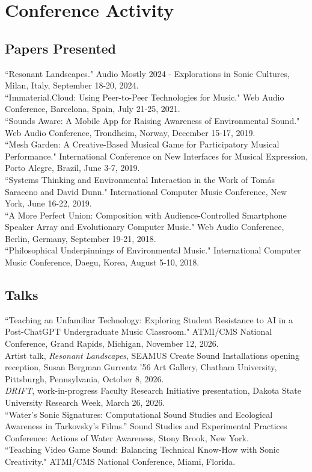 \documentclass[12pt, a4paper]{article}
\newcommand{\years}[1]{\leavevmode\marginnote{\scriptsize #1}\ignorespaces}%
\begin{document}
\section*{Conference Activity}

\subsection*{Papers Presented}
\years{2024} ``Resonant Landscapes." Audio Mostly 2024 - Explorations in Sonic Cultures, Milan, Italy, September 18-20, 2024.\\
\years{2021} ``Immaterial.Cloud: Using Peer-to-Peer Technologies for Music." Web Audio Conference, Barcelona, Spain, July 21-25, 2021. \\ 
\years{2019} ``Sounds Aware: A Mobile App for Raising Awareness of Environmental Sound." Web Audio Conference, Trondheim, Norway, December 15-17, 2019.\\
``Mesh Garden: A Creative-Based Musical Game for Participatory Musical Performance." International Conference on New Interfaces for Musical Expression, Porto Alegre, Brazil, June 3-7, 2019.\\
``Systems Thinking and Environmental Interaction in the Work of Tomás Saraceno and David Dunn." International Computer Music Conference, New York, June 16-22, 2019.\\
\years{2018} ``A More Perfect Union: Composition with Audience-Controlled Smartphone Speaker Array and Evolutionary Computer Music." Web Audio Conference, Berlin, Germany, September 19-21, 2018.\\
``Philosophical Underpinnings of Environmental Music." International Computer Music Conference, Daegu, Korea, August 5-10, 2018.\\

\subsection*{Talks}
\years{2026} ``Teaching an Unfamiliar Technology: Exploring Student Resistance to AI in a Post-ChatGPT Undergraduate Music Classroom." ATMI/CMS National Conference, Grand Rapids, Michigan, November 12, 2026.\\
Artist talk, \textit{Resonant Landscapes}, SEAMUS Create Sound Installations opening reception, Susan Bergman Gurrentz '56 Art Gallery, Chatham University, Pittsburgh, Pennsylvania, October 8, 2026.\\
\textit{DRIFT}, work-in-progress Faculty Research Initiative presentation, Dakota State University Research Week, March 26, 2026.\\
\years{2025} ``Water’s Sonic Signatures: Computational Sound Studies and Ecological Awareness in Tarkovsky’s Films.'' Sound Studies and Experimental Practices Conference: Actions of Water Awareness, Stony Brook, New York. \\
\years{2023} ``Teaching Video Game Sound: Balancing Technical Know-How with Sonic Creativity." ATMI/CMS National Conference, Miami, Florida. \\
\end{document}
